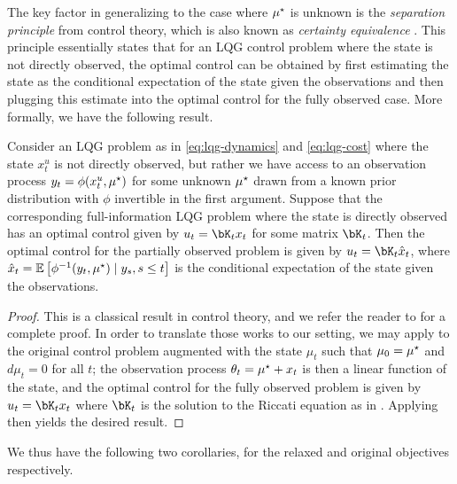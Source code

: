 The key factor in generalizing to the case where $\mu^{\star}$ is unknown is the \emph{separation principle} from control theory, which is also known as \emph{certainty equivalence} \citep{georgiou2013separation,van1981certainty,kwakernaak1972linear}.  This principle essentially states that for an LQG control problem where the state is not directly observed, the optimal control can be obtained by first estimating the state as the conditional expectation of the state given the observations and then plugging this estimate into the optimal control for the fully observed case.  More formally, we have the following result.
\begin{theorem}\label{thm:separation_principle}
    Consider an LQG problem as in \eqref{eq:lqg-dynamics} and \eqref{eq:lqg-cost} where the state $x_t^u$ is not directly observed, but rather we have access to an observation process $y_t = \phi(x_t^u, \mu^{\star})$ for some unknown $\mu^{\star}$ drawn from a known prior distribution with $\phi$ invertible in the first argument.  Suppose that the corresponding full-information LQG problem where the state is directly observed has an optimal control given by $u_t = \bK_t x_t$ for some matrix $\bK_t$.  Then the optimal control for the partially observed problem is given by $u_t = \bK_t \hat{x}_t$, where $\hat{x}_t = \mathbb{E}\left[ \phi^{-1}(y_t, \mu^{\star}) \mid y_s, s \leq t \right]$ is the conditional expectation of the state given the observations.  
\end{theorem}
\begin{proof}
    This is a classical result in control theory, and we refer the reader to \citet{georgiou2013separation,van1981certainty,kwakernaak1972linear} for a complete proof.  In order to translate those works to our setting, we may apply \citet[Theorem 14]{georgiou2013separation} to the original control problem augmented with the state $\mu_t$ such that $\mu_0 = \mu^{\star}$ and $d \mu_t = 0$ for all $t$; the observation process $\theta_t = \mu^{\star} + x_t$ is then a linear function of the state, and the optimal control for the fully observed problem is given by $u_t = \bK_t x_t$ where $\bK_t$ is the solution to the Riccati equation as in .  Applying \citet[Theorem 14]{georgiou2013separation} then yields the desired result.
\end{proof}
We thus have the following two corollaries, for the relaxed and original objectives respectively.
